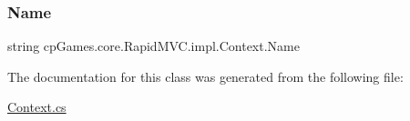 \mbox{\label{classcp_games_1_1core_1_1_rapid_m_v_c_1_1impl_1_1_context_a01651ef919129bf3f518ec88311e978f}} 
\subsubsection{\texorpdfstring{Name}{Name}}
{\footnotesize\ttfamily string cp\+Games.\+core.\+Rapid\+M\+V\+C.\+impl.\+Context.\+Name\hspace{0.3cm}{\ttfamily [get]}}



The documentation for this class was generated from the following file\+:\begin{DoxyCompactItemize}
\item 
\mbox{\hyperlink{_context_8cs}{Context.\+cs}}\end{DoxyCompactItemize}
